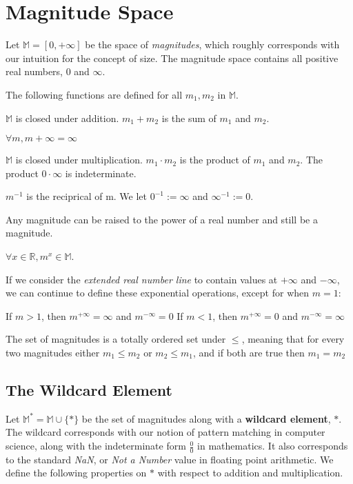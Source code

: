 \documentclass[twoside]{article}
\begin{document}
\section{Magnitude Space}

Let \(\mathbb{M} = [0, +\infty]\) be the space of \textit{magnitudes}, which roughly corresponds with our intuition for the concept of size. The magnitude space contains all positive real numbers, \(0\) and \(\infty\).

The following functions are defined for all \(m_1, m_2\) in \(\mathbb{M}\).

\(\mathbb{M}\) is closed under addition. \(m_1 + m_2\) is the sum of \(m_1\) and \(m_2\).

\(\forall m, m + \infty = \infty\)

\(\mathbb{M}\) is closed under multiplication. \(m_1 \cdot m_2\) is the product of \(m_1\) and \(m_2\). The product \(0 \cdot \infty\) is indeterminate.

\(m^{-1}\) is the reciprical of m. We let \(0^{-1} := \infty\) and \(\infty^{-1} := 0\).

Any magnitude can be raised to the power of a real number and still be a magnitude.

\(\forall x \in \mathbb{R}, m^x \in \mathbb{M}\).

If we consider the \textit{extended real number line} to contain values at \(+\infty\) and \(-\infty\), we can continue to define these exponential operations, except for when \(m = 1\):

If \(m > 1\), then \(m^{+\infty} = \infty\) and \(m^{-\infty} = 0\)
If \(m < 1\), then \(m^{+\infty} = 0\) and \(m^{-\infty} = \infty\)

The set of magnitudes is a totally ordered set under \(\leq\), meaning that for every two magnitudes either \(m_1 \leq m_2\) or \(m_2 \leq m_1\), and if both are true then \(m_1 = m_2\)

\subsection{The Wildcard Element}

Let \(\mathbb{M}^* = \mathbb{M} \cup \{\ast\}\) be the set of magnitudes along with a \textbf{wildcard element}, \(\ast\). The wildcard corresponds with our notion of pattern matching in computer science, along with the indeterminate form \(\frac{0}{0}\) in mathematics. It also corresponds to the standard \textit{NaN}, or \textit{Not a Number} value in floating point arithmetic. We define the following properties on \(\ast\) with respect to addition and multiplication.
\end{document}
